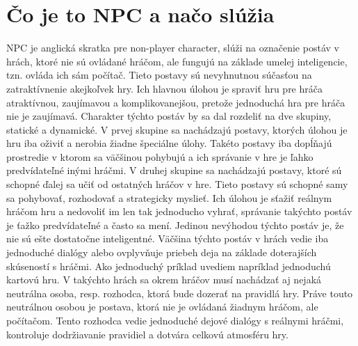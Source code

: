 \documentclass[10pt,twoside,slovak,a4paper]{article}
\begin{document}
\section{Čo je to NPC a načo slúžia}  \label{nejaka}
NPC je anglická skratka pre non-player character, slúži na označenie postáv v hrách, ktoré nie sú ovládané hráčom, ale fungujú na základe umelej inteligencie, tzn. ovláda ich sám počítač. Tieto postavy sú nevyhnutnou súčasťou na zatraktívnenie akejkoľvek hry. Ich hlavnou úlohou je spraviť hru pre hráča atraktívnou, zaujímavou a komplikovanejšou, pretože jednoduchá hra pre hráča nie je zaujímavá. Charakter týchto postáv by sa dal rozdeliť na dve skupiny, statické a dynamické. V prvej skupine sa nachádzajú postavy, ktorých úlohou je hru iba oživiť a nerobia žiadne špeciálne úlohy. Takéto postavy iba dopĺňajú prostredie v ktorom sa väčšinou pohybujú a ich správanie v hre je ľahko predvídateľné inými hráčmi. V druhej skupine sa nachádzajú postavy, ktoré sú schopné ďalej sa učiť od ostatných hráčov v hre. Tieto postavy sú schopné samy sa pohybovať, rozhodovať a strategicky myslieť. Ich úlohou je sťažiť reálnym hráčom hru a nedovoliť im len tak jednoducho vyhrať, správanie takýchto postáv je ťažko predvídateľné a často sa mení. Jedinou nevýhodou týchto postáv je, že nie sú ešte dostatočne inteligentné. Väčšina týchto postáv v hrách vedie iba jednoduché dialógy alebo ovplyvňuje priebeh deja na základe doterajších skúseností s hráčmi. Ako jednoduchý príklad uvediem napríklad jednoduchú kartovú hru. V takýchto hrách sa okrem hráčov musí nachádzať aj nejaká neutrálna osoba, resp. rozhodca, ktorá bude dozerať na pravidlá hry. Práve touto neutrálnou osobou je postava, ktorá nie je ovládaná žiadnym hráčom, ale počítačom. Tento rozhodca vedie jednoduché dejové dialógy s reálnymi hráčmi, kontroluje dodržiavanie pravidiel a dotvára celkovú atmosféru hry.  \cite{NPC}
\begin{figure*}[tbh]
\centering
\end{figure*}
\end{document}
